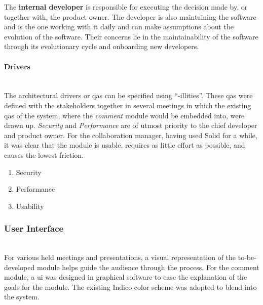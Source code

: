 The \textbf{internal developer} is responsible for executing the decision made by, or together with, the product owner. The developer is also maintaining the software and is the one working with it daily and can make assumptions about the evolution of the software. Their concerns lie in the maintainability of the software through its evolutionary cycle and onboarding new developers.
\vspace{0.5cm}
\paragraph{Drivers}\mbox{}\\

The architectural drivers or \glspl{qa} can be specified using “-illities”. These \glspl{qa} were defined with the stakeholders together in several meetings in which the existing \glspl{qa} of the system, where the \textit{comment} module would be embedded into, were drawn up. \textit{Security} and \textit{Performance} are of utmost priority to the chief developer and product owner. For the collaboration manager, having used Solid for a while, it was clear that the module is usable, requires as little effort as possible, and causes the lowest friction.

\begin{enumerate}
    \item Security
    \item Performance
    \item Usability
\end{enumerate}

\subsubsection{User Interface}\mbox{}\\

For various held meetings and presentations, a visual representation of the to-be-developed module helps guide the audience through the process. For the comment module, a \gls{ui} was designed in graphical software to ease the explanation of the goals for the module. The existing Indico color scheme was adopted to blend into the system.

